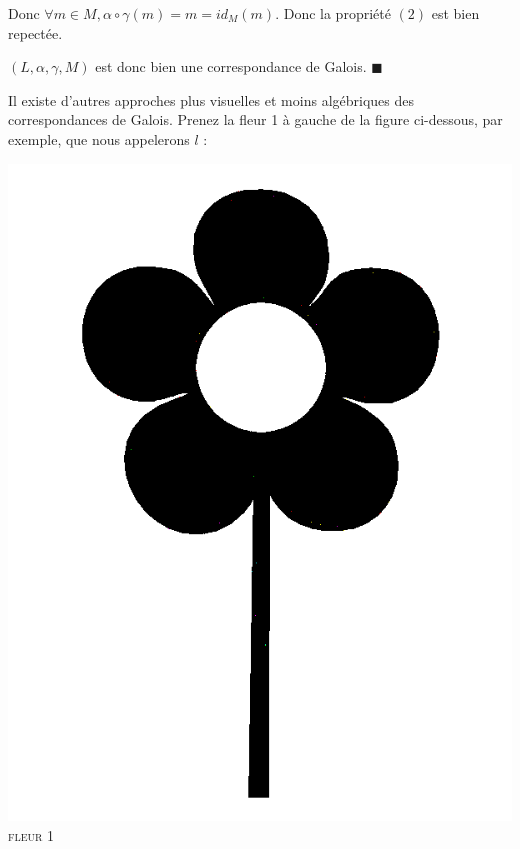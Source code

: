 \documentclass[french]{article}
\begin{document}
  Donc $\forall m \in M, \alpha \circ \gamma (m) = m = id_M(m)$. Donc la propriété $(2)$ est bien repectée.

  $(L, \alpha, \gamma, M)$ est donc bien une correspondance de Galois. \hfill $\blacksquare$

  \bigbreak

  Il existe d'autres approches plus visuelles et moins algébriques des correspondances de Galois. Prenez la fleur 1 à gauche de la figure ci-dessous, par exemple, que nous appelerons $l$ :


  \begin{center}
    \begin{minipage}{.3\textwidth}
      \begin{center}
	\includegraphics[scale=0.19]{./pictures/flower2.png}\\
	\textsc{fleur 1}
      \end{center}
    \end{minipage}

\end{center}
\end{document}
